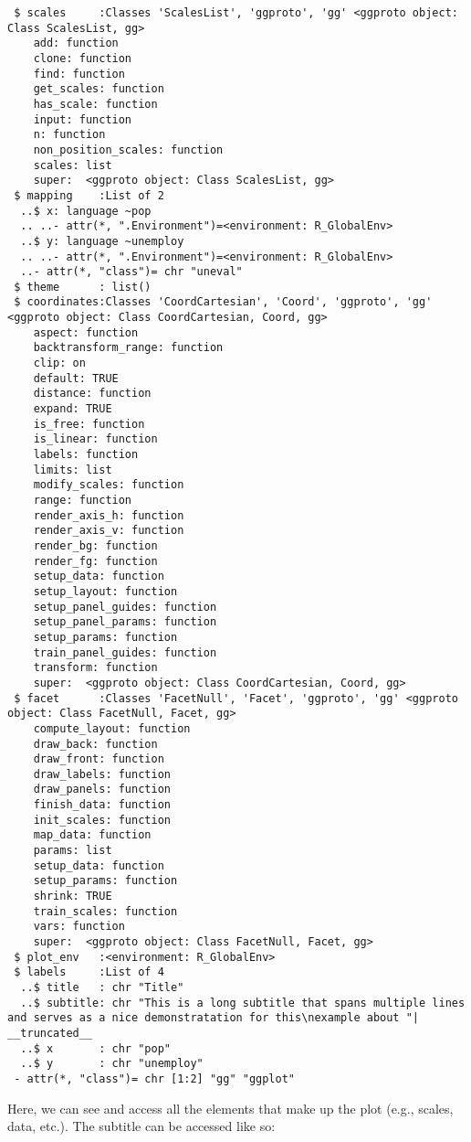 \documentclass[
  letterpaper,
  DIV=11,
  numbers=noendperiod]{scrreprt}
\newenvironment{Shaded}{\begin{snugshade}}{\end{snugshade}}
\newcommand{\NormalTok}[1]{\textcolor[rgb]{0.00,0.23,0.31}{#1}}
\newcommand{\OtherTok}[1]{\textcolor[rgb]{0.00,0.23,0.31}{#1}}
\newcommand{\SpecialCharTok}[1]{\textcolor[rgb]{0.37,0.37,0.37}{#1}}
\begin{document}
\begin{verbatim}
 $ scales     :Classes 'ScalesList', 'ggproto', 'gg' <ggproto object: Class ScalesList, gg>
    add: function
    clone: function
    find: function
    get_scales: function
    has_scale: function
    input: function
    n: function
    non_position_scales: function
    scales: list
    super:  <ggproto object: Class ScalesList, gg> 
 $ mapping    :List of 2
  ..$ x: language ~pop
  .. ..- attr(*, ".Environment")=<environment: R_GlobalEnv> 
  ..$ y: language ~unemploy
  .. ..- attr(*, ".Environment")=<environment: R_GlobalEnv> 
  ..- attr(*, "class")= chr "uneval"
 $ theme      : list()
 $ coordinates:Classes 'CoordCartesian', 'Coord', 'ggproto', 'gg' <ggproto object: Class CoordCartesian, Coord, gg>
    aspect: function
    backtransform_range: function
    clip: on
    default: TRUE
    distance: function
    expand: TRUE
    is_free: function
    is_linear: function
    labels: function
    limits: list
    modify_scales: function
    range: function
    render_axis_h: function
    render_axis_v: function
    render_bg: function
    render_fg: function
    setup_data: function
    setup_layout: function
    setup_panel_guides: function
    setup_panel_params: function
    setup_params: function
    train_panel_guides: function
    transform: function
    super:  <ggproto object: Class CoordCartesian, Coord, gg> 
 $ facet      :Classes 'FacetNull', 'Facet', 'ggproto', 'gg' <ggproto object: Class FacetNull, Facet, gg>
    compute_layout: function
    draw_back: function
    draw_front: function
    draw_labels: function
    draw_panels: function
    finish_data: function
    init_scales: function
    map_data: function
    params: list
    setup_data: function
    setup_params: function
    shrink: TRUE
    train_scales: function
    vars: function
    super:  <ggproto object: Class FacetNull, Facet, gg> 
 $ plot_env   :<environment: R_GlobalEnv> 
 $ labels     :List of 4
  ..$ title   : chr "Title"
  ..$ subtitle: chr "This is a long subtitle that spans multiple lines and serves as a nice demonstratation for this\nexample about "| __truncated__
  ..$ x       : chr "pop"
  ..$ y       : chr "unemploy"
 - attr(*, "class")= chr [1:2] "gg" "ggplot"
\end{verbatim}

Here, we can see and access all the elements that make up the plot
(e.g., scales, data, etc.). The subtitle can be accessed like so:

\begin{Shaded}
\end{Shaded}
\end{document}

